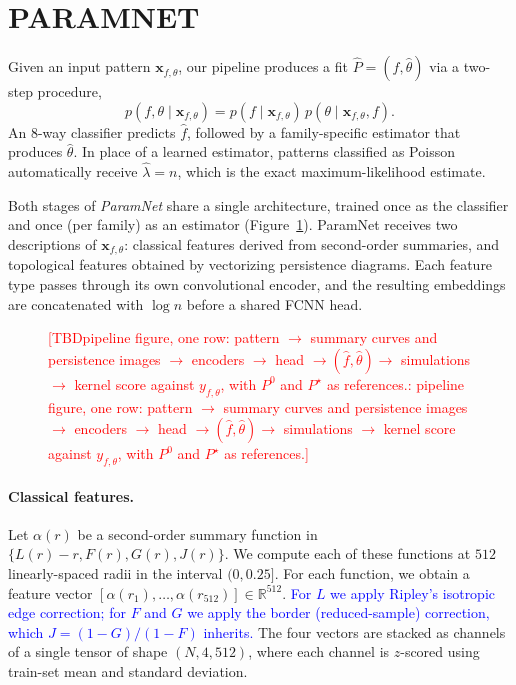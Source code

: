 \documentclass[twoside]{article}
\newcommand{\TBD}[1]{\textcolor{red}{[TBD\ifx\relax#1\relax\else: #1\fi]}}
\newcommand{\review}[1]{\textcolor{blue}{#1}}
\newcommand{\pc}{\mathbf{x}}
\begin{document}

\section{PARAMNET}
\label{sec:model}

Given an input pattern $\pc_{f, \theta}$, our pipeline produces a fit $\hat P = (\hat f, \hat\theta)$ via a two-step procedure,
\[
  p(f,\theta\mid \pc_{f, \theta})=p(f\mid \pc_{f, \theta})\,p(\theta\mid \pc_{f, \theta},f).
\]
An 8-way classifier predicts $\hat f$, followed by a family-specific estimator that produces $\hat\theta$. In place of a learned estimator, patterns classified as Poisson automatically receive $\hat \lambda=n$, which is the exact maximum-likelihood estimate.

Both stages of \emph{ParamNet} share a single architecture, trained once as the classifier and once (per family) as an estimator (Figure~\ref{fig:pipeline}). ParamNet receives two descriptions of $\pc_{f, \theta}$: classical features derived from second-order summaries, and topological features obtained by vectorizing persistence diagrams. Each feature type passes through its own convolutional encoder, and the resulting embeddings are concatenated with $\log n$ before a shared FCNN head.

\begin{figure}[t]
\centering
\framebox[\textwidth]{\rule{0pt}{1.6in}\TBD{pipeline figure}}
\caption[Pipeline]{\TBD{pipeline figure, one row: pattern $\to$ summary curves and persistence images $\to$ encoders $\to$
head $\to(\hat f,\hat\theta)\to$ simulations $\to$ kernel score against $y_{f,\theta}$, with $P^0$ and
$P^\star$ as references.}}
\label{fig:pipeline}
\end{figure}

\paragraph{Classical features.}
\label{sec:inputs}
Let $\alpha(r)$ be a second-order summary function in $\{L(r)-r, F(r), G(r), J(r)\}$. We compute each of these functions at $512$ linearly-spaced radii in the interval $(0, 0.25]$. For each function, we obtain a feature vector $[\alpha(r_1), \dots, \alpha(r_{512})] \in \mathbb{R}^{512}$. \review{For $L$ we apply Ripley's isotropic edge correction; for $F$ and $G$ we apply the border (reduced-sample) correction, which $J=(1-G)/(1-F)$ inherits.} The four vectors are stacked as channels of a single tensor of shape $(N, 4, 512)$, where each channel is $z$-scored using train-set mean and standard deviation.
\end{document}

